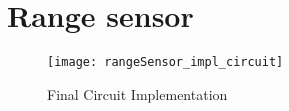 \graphicspath{{content/4_implementation/figures/}}
\section{Range sensor}\label{sec:current_sensor_physical}

\begin{figure}[!htb]
  \centering
  \texttt{[image: rangeSensor\_impl\_circuit]}
  \caption{Final Circuit Implementation}
\end{figure}